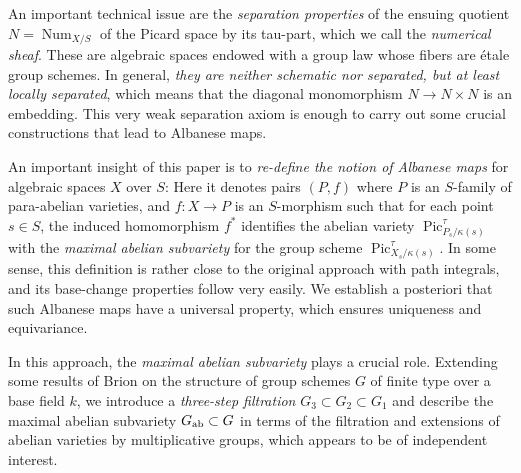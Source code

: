 \documentclass[oneside, 12pt]{amsart}
\theoremstyle{definition}
\theoremstyle{remark}
\newcommand{\Num}{\operatorname{Num}}
\newcommand{\Pic}{\operatorname{Pic}}
\newcommand{\ra}{\rightarrow}
\begin{document}
An important technical issue are the \emph{separation properties} of the ensuing quotient $N=\Num_{X/S}$ of the Picard space by its tau-part,
which we call the \emph{numerical sheaf}. These are algebraic spaces endowed with a group law whose fibers
are \'etale group schemes. In general, \emph{they are neither schematic nor separated, but   at least  locally separated},
which means that the diagonal monomorphism $N\ra N\times N$ is an embedding. This very weak separation axiom is enough to carry out
some crucial constructions that lead to Albanese maps.

An important insight of this paper is to \emph{re-define the notion of  Albanese maps} for    algebraic spaces $X$ over $S$:
Here it  denotes    pairs $(P,f)$  where $P$ is an $S$-family of para-abelian varieties, and $f:X\ra P$ is an $S$-morphism
such that for each point $s\in S$, the induced homomorphism  $f^*$ identifies  the abelian variety $\Pic^\tau_{P_s/\kappa(s)}$ with the 
\emph{maximal abelian subvariety} for the group scheme $\Pic^\tau_{X_s/\kappa(s)}$.
In some sense,  this definition is rather close to the original approach   with path integrals, and its  base-change properties follow  very easily.
We establish a posteriori that such Albanese maps have a universal property, which ensures uniqueness and equivariance.

In this approach, the \emph{maximal abelian subvariety} plays a crucial role. 
Extending some results of Brion \cite{Brion 2017} on the structure of group schemes $G$ of finite type over a base field $k$,
we introduce a \emph{three-step filtration} $G_3\subset G_2\subset G_1$ and describe the maximal abelian subvariety $G_{\text{\rm ab}}\subset G$
in terms of the  filtration and  extensions of abelian varieties by multiplicative groups, which appears to be of independent 
interest.
\end{document}

